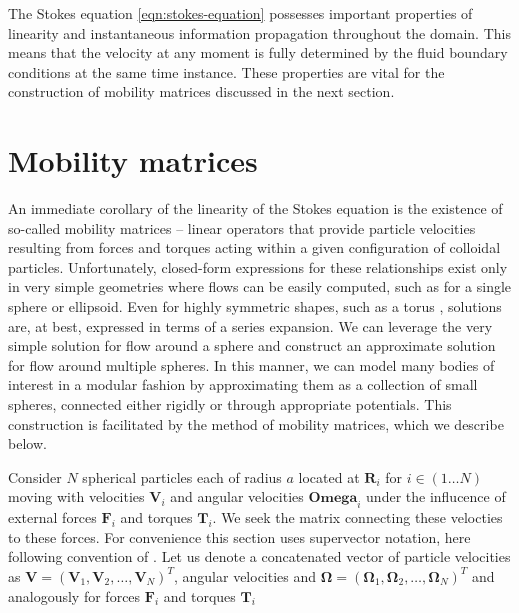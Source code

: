 \documentclass{doctoral}
\begin{document}
The Stokes equation \eqref{eqn:stokes-equation} possesses important properties of linearity and instantaneous information propagation throughout the domain.
This means that the velocity at any moment is fully determined by the fluid boundary conditions at the same time instance.
These properties are vital for the construction of mobility matrices discussed in the next section.

\section{Mobility matrices}

An immediate corollary of the linearity of the Stokes equation is the existence of so-called mobility matrices -- linear operators that provide particle velocities resulting from forces and torques acting within a given configuration of colloidal particles.
Unfortunately, closed-form expressions for these relationships exist only in very simple geometries where flows can be easily computed, such as for a single sphere or ellipsoid.
Even for highly symmetric shapes, such as a torus \cite{Goren_1980, Majumdar_1977}, solutions are, at best, expressed in terms of a series expansion.
We can leverage the very simple solution for flow around a sphere and construct an approximate solution for flow around multiple spheres.
In this manner, we can model many bodies of interest in a modular fashion by approximating them as a collection of small spheres, connected either rigidly or through appropriate potentials.
This construction is facilitated by the method of mobility matrices, which we describe below.

Consider $N$ spherical particles each of radius $a$ located at $\bm{R}_i$ for $i \in (1 \dots N)$ moving with velocities $\bm{V}_i$ and angular velocities $\bm{Omega}_i$ under the influcence of external forces $\bm{F}_i$ and torques $\bm{T}_i$.
We seek the matrix connecting these velocties to these forces.
For convenience this section uses supervector notation, here following convention of \cite{Nagele_2013}.
Let us denote a concatenated vector of particle velocities as $\bm{V} = (\bm{V}_1,\bm{V}_2,\dots,\bm{V}_N)^{T}$, angular velocities and $\bm{\Omega} = (\bm{\Omega}_1,\bm{\Omega}_2,\dots,\bm{\Omega}_N)^{T}$ and analogously for forces $\bm{F}_i$ and torques $\bm{T}_i$ 
\end{document}
